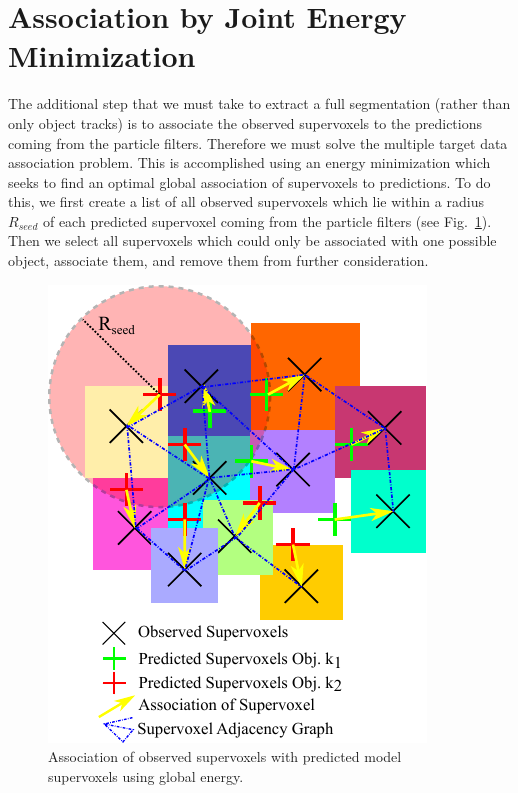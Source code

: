 \section{Association by Joint Energy Minimization}
The additional step that we must take to extract a full segmentation (rather than only object tracks) is to associate the observed supervoxels to the predictions coming from the particle filters. Therefore we must solve the multiple target data association problem. This is accomplished using an energy minimization which seeks to find an optimal global association of supervoxels to predictions. To do this, we first create a list of all observed supervoxels which lie within a radius $R_{seed}$ of each predicted supervoxel coming from the particle filters (see Fig.~\ref{fig:Association}). Then we select all supervoxels which could only be associated with one possible object, associate them, and remove them from further consideration.

\begin{figure}[tb]
  \centering
  \includegraphics[scale=1.0]{figures/IROS2013/Association.pdf}
  \caption[Supervoxel Association]{Association of observed supervoxels with predicted model supervoxels using global energy.}
  \label{fig:Association}
\end{figure}

